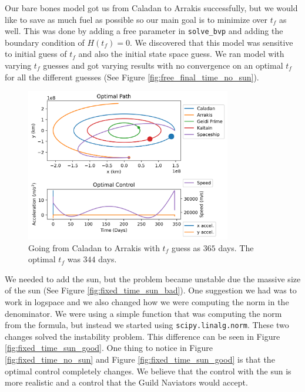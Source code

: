 \documentclass[11pt]{amsart}
\begin{document}
Our bare bones model got us from Caladan to Arrakis successfully, but we would like to save as much fuel as possible so our main goal is to minimize over $t_f$ as well. This was done by 
adding a free parameter in \lstinline{solve_bvp} and adding the boundary condition of $H(t_f) = 0$. We discovered that this model was sensitive to initial guess of $t_f$ and also the initial
state space guess. We ran model with varying $t_f$ guesses and got varying results with no convergence on an optimal $t_f$ for all the different guesses (See Figure \ref{fig:free_final_time_no_sun}). 

\begin{figure}[htp]
    \centering
    \includegraphics[width=0.8\textwidth]{f5.png}\hfill
    \caption{Going from Caladan to Arrakis with $t_f$ guess as $365$ days. The optimal $t_f$ was $344$ days.}
    \label{fig:free_time_no_sun}
\end{figure}

We needed to add the sun, but the problem became unstable due the massive size of the sun (See Figure \ref{fig:fixed_time_sun_bad}). One suggestion we had was to work in logspace and we also changed how 
we were computing the norm in the denominator. We were using a simple function that was computing the norm from the formula, but instead we started using \lstinline{scipy.linalg.norm}. These two changes 
solved the instability problem. This difference can be seen in Figure \ref{fig:fixed_time_sun_good}. One thing to notice in Figure \ref{fig:fixed_time_no_sun} and Figure \ref{fig:fixed_time_sun_good} is that the
optimal control completely changes. We believe that the control with the sun is more realistic and a control that the Guild Naviators would accept.
\end{document}

